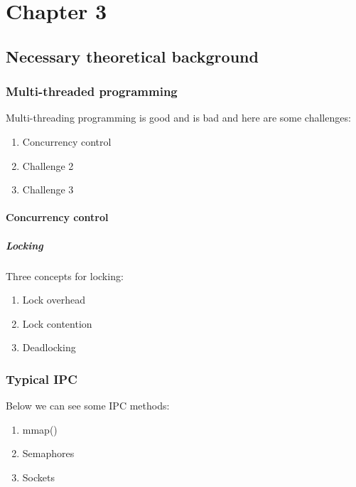 \chapter{Chapter 3}\label{ch:archipelago}

\section{Necessary theoretical background}

\subsection{Multi-threaded programming}


Multi-threading programming is good and is bad and here are some challenges:

\begin{enumerate}
	\item Concurrency control
	\item Challenge 2
	\item Challenge 3
\end{enumerate}

\subsubsection{Concurrency control}

\paragraph{Locking}


Three concepts for locking:

\begin{enumerate}
	\item Lock overhead
	\item Lock contention
	\item Deadlocking
\end{enumerate}

\subsection{Typical IPC}

Below we can see some IPC methods:

\begin{enumerate}
	\item mmap()
	\item Semaphores
	\item Sockets
\end{enumerate}

